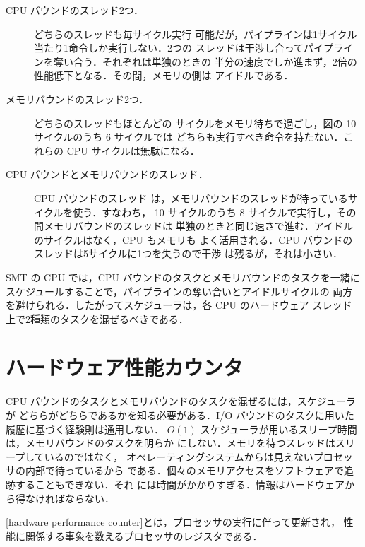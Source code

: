 \documentclass[../main.tex]{subfiles}
\begin{document}
\begin{description}
  \item[CPU バウンドのスレッド2つ．] どちらのスレッドも毎サイクル実行
    可能だが，パイプラインは1サイクル当たり1命令しか実行しない．2つの
    スレッドは干渉し合ってパイプラインを奪い合う．それぞれは単独のときの
    半分の速度でしか進まず，2倍の性能低下となる．その間，メモリの側は
    アイドルである．
  \item[メモリバウンドのスレッド2つ．] どちらのスレッドもほとんどの
    サイクルをメモリ待ちで過ごし，図の 10 サイクルのうち 6 サイクルでは
    どちらも実行すべき命令を持たない．これらの CPU サイクルは無駄になる．
  \item[CPU バウンドとメモリバウンドのスレッド．] CPU バウンドのスレッド
    は，メモリバウンドのスレッドが待っているサイクルを使う．すなわち，
    10 サイクルのうち 8 サイクルで実行し，その間メモリバウンドのスレッドは
    単独のときと同じ速さで進む．アイドルのサイクルはなく，CPU もメモリも
    よく活用される．CPU バウンドのスレッドは5サイクルに1つを失うので干渉
    は残るが，それは小さい．
\end{description}

\begin{keypoint}
  SMT の CPU では，CPU バウンドのタスクとメモリバウンドのタスクを一緒に
  スケジュールすることで，パイプラインの奪い合いとアイドルサイクルの
  両方を避けられる．したがってスケジューラは，各 CPU のハードウェア
  スレッド上で2種類のタスクを混ぜるべきである．
\end{keypoint}

\section{ハードウェア性能カウンタ}
\label{sec:l07-counters}

CPU バウンドのタスクとメモリバウンドのタスクを混ぜるには，スケジューラが
どちらがどちらであるかを知る必要がある．I/O バウンドのタスクに用いた履歴に基づく経験則は通用しない．
$O(1)$ スケジューラが用いるスリープ時間は，メモリバウンドのタスクを明らか
にしない．メモリを待つスレッドはスリープしているのではなく，
オペレーティングシステムからは見えないプロセッサの内部で待っているから
である．個々のメモリアクセスをソフトウェアで追跡することもできない．それ
には時間がかかりすぎる．情報はハードウェアから得なければならない．

\begin{definition}[ハードウェア性能カウンタ]
  [hardware performance counter]とは，プロセッサの実行に伴って更新され，
  性能に関係する事象を数えるプロセッサのレジスタである．
\end{definition}
\end{document}
